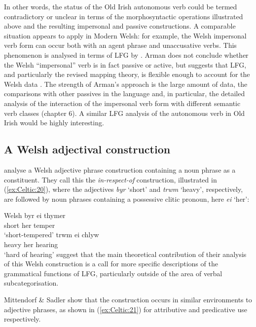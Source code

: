 \documentclass[output=paper,colorlinks,citecolor=brown]{langscibook}
\begin{document}
In other words, the status of the Old Irish autonomous verb could be termed contradictory or unclear in terms of the morphosyntactic operations illustrated above and the resulting impersonal and passive constructions. A comparable situation appears to apply in Modern Welsh: for example, the Welsh impersonal verb form can occur both with an agent phrase and unaccusative verbs. This phenomenon is analysed in terms of LFG by \citet{Arman2015}. Arman does not conclude whether the Welsh ``impersonal'' verb is in fact passive or active, but suggests that LFG, and particularly the revised mapping theory, is flexible enough to account for the Welsh data \citep[paragraph~7.3]{Arman2015}. The strength of Arman's approach is the large amount of data, the comparisons with other passives in the language and, in particular, the detailed analysis of the interaction of the impersonal verb form with different semantic verb classes (chapter 6). A similar LFG analysis of the autonomous verb in Old Irish would be highly interesting.

\subsection{A Welsh adjectival construction}
\label{sec:Celtic:3.3}

\citet{MittSadl08} analyse a Welsh adjective phrase construction containing a noun phrase as a constituent. They call this the \emph{in-respect-of} construction, illustrated in (\ref{ex:Celtic:20}), where the adjectives \emph{byr} `short' and \emph{trwm} `heavy', respectively, are followed by noun phrases containing a possessive clitic pronoun, here \emph{ei} `her':

\ea\label{ex:Celtic:20} Welsh \citep[2]{MittSadl08}
\ea
\gll byr  ei thymer\\
short her temper\\
\glt`short-tempered'
\ex
\gll trwm ei chlyw\\
heavy her hearing\\
\glt`hard of hearing'
\z\z
\citet[19--20]{MittSadl08} suggest that the main theoretical contribution of their analysis of this Welsh construction is a call for more specific descriptions of the grammatical functions of LFG, particularly outside of the area of verbal subcategorisation.

Mittendorf \& Sadler show that the construction occurs in similar environments to adjective phrases, as shown in (\ref{ex:Celtic:21}) for attributive and predicative use respectively.
\end{document}
